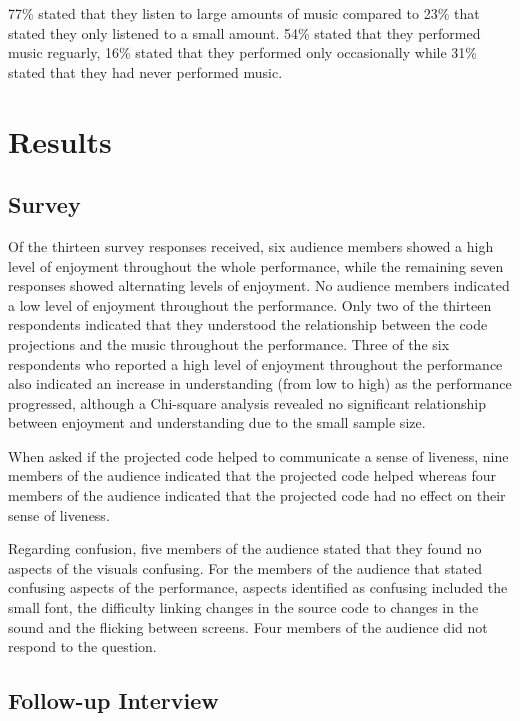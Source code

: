 77\% stated that they listen to large amounts of music compared to 23\% that stated they only listened to a small amount. 54\% stated that they performed music reguarly, 16\% stated that they performed only occasionally while 31\% stated that they had never performed music.

\section{Results}

\subsection{Survey}

Of the thirteen survey responses received, six audience members showed a high level of enjoyment throughout the whole performance, while the remaining seven responses showed alternating levels of enjoyment. No audience members indicated a low level of enjoyment throughout the performance.  Only two of the thirteen respondents indicated that they understood the relationship between the code projections and the music throughout the performance. Three of the six respondents who reported a high level of enjoyment throughout the performance also indicated an increase in understanding (from low to high) as the performance progressed, although a Chi-square analysis revealed no significant relationship between enjoyment and understanding due to the small sample size. 

When asked if the projected code helped to communicate a sense of liveness, nine members of the audience indicated that the projected code helped whereas four members of the audience indicated that the projected code had no effect on their sense of liveness.

Regarding confusion, five members of the audience stated that they found no aspects of the visuals confusing. For the members of the audience that stated confusing aspects of the performance, aspects identified as confusing included the small font, the difficulty linking changes in the source code to changes in the sound and the flicking between screens. Four members of the audience did not respond to the question.

\subsection{Follow-up Interview}

